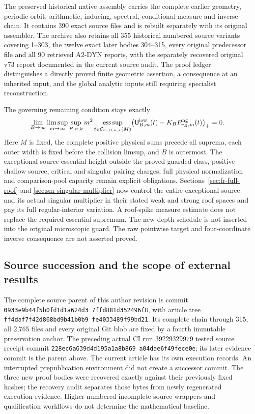 \documentclass[11pt,reqno]{amsart}
\numberwithin{equation}{section}
\theoremstyle{definition}\newtheorem{definition}[theorem]{Definition}
\theoremstyle{remark}\newtheorem{remark}[theorem]{Remark}
\begin{document}
The preserved historical native assembly carries the complete
earlier geometry, periodic orbit, arithmetic, inducing, spectral,
conditional-measure and inverse chain.  It contains 390 exact
source files and is rebuilt separately with its original assembler.
The archive also retains all 355 historical numbered source variants
covering 1--303, the twelve exact later bodies 304--315, every original
predecessor file and all 90
retrieved A2-DYN reports, with the separately recovered original v73
report documented in the current source audit.  The proof ledger distinguishes a directly
proved finite geometric assertion, a consequence at an inherited
input, and the global analytic inputs still requiring specialist
reconstruction.

The governing remaining condition stays exactly
\begin{equation}\label{eq:sc-original-obligation}
 \lim_{B\to\infty}\limsup_{m\to\infty}\sup_{R,n,k}
 m^2\operatorname*{ess\,sup}_{t\in\mathcal C_{m,R,n,k}(M)}
 \bigl(\mathsf U^{\rm low}_{B,m}(t)
                   -K_BP^{\rm ng}_{r_B,m}(t)\bigr)_+=0 .
\end{equation}
Here $M$ is fixed, the complete positive physical sums precede all
suprema, each outer width is fixed before the collision limsup,
and $B$ is outermost.  The exceptional-source essential height outside the proved guarded
class, positive shallow source, critical and singular pairing charges,
full physical normalization and comparison-pool capacity remain explicit
obligations. Sections~\ref{sec:fr-full-roof} and
\ref{sec:sm-singular-multiplier} now control the entire exceptional
source and its actual singular multiplier in their stated weak and strong
roof spaces and pay its full regular-interior variation. A roof-spike
measure estimate does not replace the required essential supremum.  The new depth schedule is not inserted
into the original microscopic guard.  The raw pointwise target
and four-coordinate inverse consequence are not asserted proved.

\subsection*{Source succession and the scope of external results}
The complete source parent of this author revision is commit
\texttt{0933e9b4\allowbreak 4f5b0fd1\allowbreak d1a624d3\allowbreak
7ffd881d\allowbreak 352496f8}, with article tree
\texttt{ff4daf7f\allowbreak 42d868bd\allowbreak 9b41b0b9\allowbreak
fe403348\allowbreak 9f99bd21}.
Its complete chain through 315, all 2,765 files and every original
Git blob are fixed by a fourth immutable preservation anchor.
The preceding actual CI run 39229329979 tested source receipt commit
\texttt{228ec6a6\allowbreak 39d4d195\allowbreak a1a8b869\allowbreak
a04dae6f\allowbreak 49fece0e}; its later evidence commit is the parent
above. The current article has its own execution records.
An interrupted prepublication environment did not create a successor
commit. The three new proof bodies were recovered exactly against
their previously fixed hashes; the recovery audit separates those
bytes from newly regenerated execution evidence.
Higher-numbered incomplete source wrappers and qualification workflows
do not determine the mathematical baseline.
\end{document}
